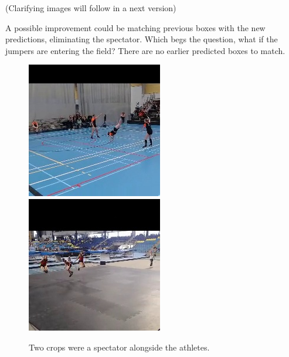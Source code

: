 (Clarifying images will follow in a next version)

A possible improvement could be matching previous boxes with the new predictions, eliminating the spectator. Which begs the question, what if the jumpers are entering the field? There are no earlier predicted boxes to match.

\begin{figure}
    \centering
    \includegraphics[width=0.45\linewidth]{img/1267_292_cropped}
    \includegraphics[width=0.45\linewidth]{img/1405_1061_cropped}
    \caption[dd3-crop-error]{Two crops were a spectator alongside the athletes.}
    \label{fig:dd3-crop-error}
\end{figure}

